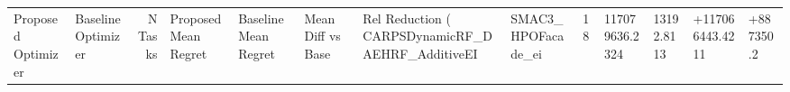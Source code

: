 \begin{tabular}{llrlllllllll}
\toprule
Proposed Optimizer & Baseline Optimizer & N Tasks & Proposed Mean Regret & Baseline Mean Regret & Mean Diff vs Base & Rel Reduction (%
\midrule
CARPSDynamicRF_DAEHRF_AdditiveEI & SMAC3_HPOFacade_ei & 18 & 117079636.2324 & 13192.8113 & +117066443.4211 & +887350.2%
\bottomrule
\end{tabular}
